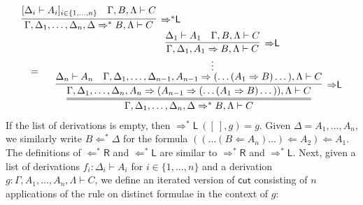 \documentclass[a4paper,UKenglish,cleveref,autoref,thm-restate, anonymous]{lipics-v2021}
\newcommand{\proofbox}[1]{\begin{array}{c} #1 \end{array}}
\newcommand{\Larr}{\Leftarrow}
\newcommand{\Ls}{\Leftarrow^*}
\newcommand{\Rarr}{\Rightarrow}
\newcommand{\Rs}{\Rightarrow^*}
\newcommand{\mf}[1]{\mathsf{#1}}
\newcommand{\GG}{\Gamma}
\newcommand{\GD}{\Delta}
\newcommand{\GL}{\Lambda}
\newcommand{\vd}{\vdash}
\newcommand{\Lsl}{{\Ls}\mathsf{L}}
\newcommand{\Lr}{{\Larr}\mathsf{R}}
\newcommand{\Lsr}{{\Ls}\mathsf{R}}
\newcommand{\Rl}{{\Rarr}\mathsf{L}}
\newcommand{\Rsl}{{\Rs}\mathsf{L}}
\newcommand{\Rsr}{{\Rs}\mathsf{R}}
\newcommand{\cut}{\mf{cut}}
\begin{document}
\begin{equation*}
  \begin{array}{l}
    \proofbox{
      \infer[\Rsl]{\GG, \GD_1 , \dots , \GD_n , \GD \Rs B,\GL \vd C}{
        [\GD_i \vd A_i]_{i \in \{1,\dots,n\}}
        &
        \GG , B , \GL \vd C
      }
    }
    \\
    \hspace*{0.5cm}=\quad
    \proofbox{
      \infer={\GG, \GD_1 , \dots , \GD_n , \GD \Rs B,\GL \vd C}{
        \infer[\Rl]{\GG, \GD_1 , \dots , \GD_n , A_n \Rarr (A_{n-1} \Rarr (\dots (A_1 \Rarr B)\dots)),\GL \vd C}{
          \GD_n \vd A_n
          &
          \deduce[\vdots]{\GG, \GD_1 , \dots , \GD_{n-1} , A_{n-1} \Rarr (\dots (A_1 \Rarr B)\dots),\GL \vd C}{
            \infer[\Rl]{\GG , \GD_1 , A_1 \Rarr B , \GL \vd C}{
              \GD_1 \vd A_1
              &
              \GG , B , \GL \vd C
            }
          }
        }
      }
    }
  \end{array}
\end{equation*}
If the list of derivations is empty, then $\Rsl \ ([~] , g) = g$.
Given $\GD = A_1, \dots, A_n$, we similarly write $B \Larr^* \GD$ for the formula $((\dots(B \Larr A_n) \dots) \Larr A_2) \Larr A_1$.
The definitions of $\Lsr$ and $\Lsl$ are similar to $\Rsr$ and $\Rsl$.
Next, given a list of derivations $f_i : \GD_i \vd A_i$ for $i \in \{1,\dots, n\}$ and a derivation $g : \GG , A_1, \dots, A_n, \GL \vd C$, we define an iterated version of $\cut$ consisting of $n$ applications of the rule on distinct formulae in the context of $g$:
\end{document}
